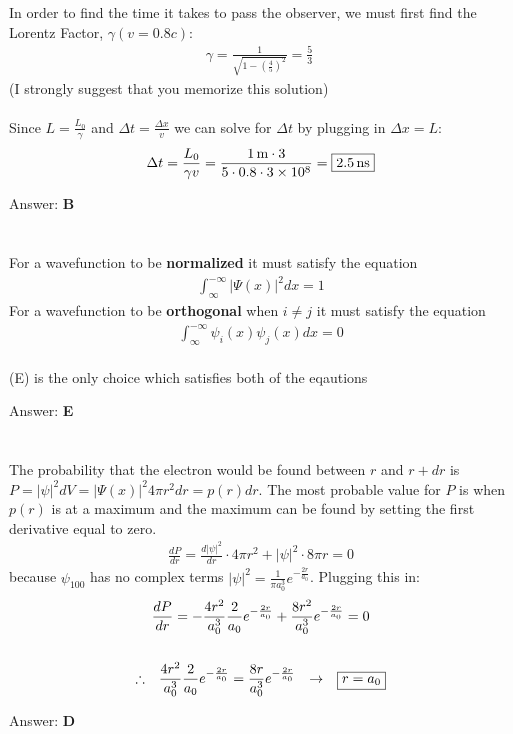 \documentclass[12pt]{article}
\newcommand{\Answer}[1]{Answer: \textbf{#1}}
\newcommand{\Problem}[3]{
    \setcounter{section}{#1}
    \addtocounter{section}{-1}
    \section{}
    #3\par\par
    \Answer{#2}
}
\begin{document}
\Problem{24}{B}{%
In order to find the time it takes to pass the observer, we must first find the Lorentz Factor, $\gamma (v = 0.8c)$:
\begin{align}
\gamma = \frac{1}{\sqrt{1- {\left(\frac{4}{5}\right)}^2}}= \frac{5}{3}\
\end{align}
(I strongly suggest that you memorize this solution)
\\\\
Since $L = \frac{L_{0}}{\gamma}$ and $\Delta t = \frac{\Delta x}{v}$ we can solve for $\Delta t$ by plugging in $\Delta x = L$:
\begin{align}
\Delta t = \frac{L_{0}}{\gamma v} = \frac{1\,\text{m} \cdot 3}{5 \cdot 0.8 \cdot 3\times 10^{8}} = \boxed{2.5\,\text{ns}}\nonumber
\end{align}
}


\Problem{25}{E}{%
For a wavefunction to be  \textbf{normalized} it must satisfy the equation
\begin{align}
\int_{\infty}^{-\infty} |\Psi (x)| ^{2} dx = 1
\end{align}
For a wavefunction to be \textbf{orthogonal} when $i \neq j$ it must satisfy the equation
\begin{align}
\int_{\infty}^{-\infty} \psi_{i} (x) \psi_{j} (x)  dx = 0
\end{align}
\\
(E) is the only choice which satisfies both of the eqautions
}

\Problem{26}{D}{%
The probability that the electron would be found between $r$ and $r+dr$ is $P = |\psi |^{2} dV = |\Psi (x) |^{2} 4 \pi r^{2} dr = p(r)dr$. The most probable value for $P$ is when $p(r)$ is at a maximum and the maximum can be found by setting the first derivative equal to zero.
\begin{align}
\frac{dP}{dr} = \frac{d|\psi |^{2}}{dr} \cdot 4 \pi r^2 + |\psi |^{2} \cdot 8 \pi r = 0
\end{align}
because $\psi_{100}$ has no complex terms $|\psi |^{2} = \frac{1}{\pi a_{0}^3} e^{-\frac{2 r}{a_{0}}}$. Plugging  this in:
\begin{gather}
\frac{dP}{dr} = -\frac{4 r^2}{a_{0}^3} \frac{2}{a_{0}} e^{-\frac{2 r}{a_{0}}} + \frac{8 r^2}{a_{0}^3} e^{-\frac{2 r}{a_{0}}} = 0\nonumber\\
\nonumber\\
\therefore \hspace{.1in} \frac{4 r^2}{a_{0}^3} \frac{2}{a_{0}} e^{-\frac{2 r}{a_{0}}} = \frac{8 r}{a_{0}^3} e^{-\frac{2 r}{a_{0}}} \hspace{.1in} \rightarrow \hspace{.1in} \boxed {r = a_{0}}\nonumber
\end{gather}
}
\end{document}
